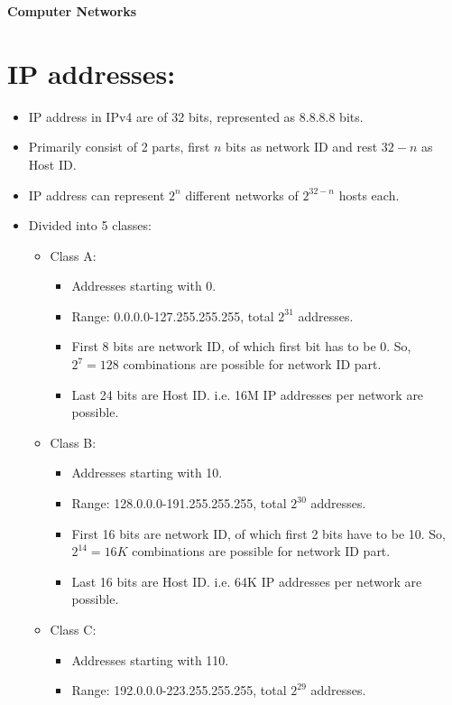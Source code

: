 \documentclass{article}
\begin{document}
\begin{center}
	\LARGE \textbf{Computer Networks}\\
	\vspace{20pt}
\end{center}
\tableofcontents
\large
	\section{IP addresses:}
	\begin{itemize}
		\item IP address in IPv4 are of 32 bits, represented as 8.8.8.8 bits.
		\item Primarily consist of 2 parts, first $n$ bits as network ID and rest $32-n$ as Host ID.
		\item IP address can represent $2^n$ different networks of $2^{32-n}$ hosts each.
		\item Divided into 5 classes:\begin{itemize}
			\item Class A: \begin{itemize}
				\item Addresses starting with 0.
				\item Range: 0.0.0.0-127.255.255.255, total $2^{31}$ addresses.
				\item First 8 bits are network ID, of which first bit has to be 0. So, $2^7=128$ combinations are possible for network ID part.
				\item Last 24 bits are Host ID. i.e. 16M IP addresses per network are possible.
			\end{itemize}
			\item Class B: \begin{itemize}
				\item Addresses starting with 10.
				\item Range: 128.0.0.0-191.255.255.255, total $2^{30}$ addresses.
				\item First 16 bits are network ID, of which first 2 bits have to be 10. So, $2^{14}=16K$ combinations are possible for network ID part.
				\item Last 16 bits are Host ID. i.e. 64K IP addresses per network are possible.
			\end{itemize}
			\item Class C: \begin{itemize}
				\item Addresses starting with 110.
				\item Range: 192.0.0.0-223.255.255.255, total $2^{29}$ addresses.

\end{itemize}
\end{itemize}
\end{itemize}
\end{document}
